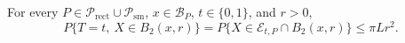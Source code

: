 For every \(P\in\mathcal P_{\mathrm{rect}}\cup\mathcal P_{\mathrm{sm}}\),
\(x\in\mathcal B_P\), \(t\in\{0,1\}\), and \(r>0\),
\[
 P\{T=t,\ X\in B_2(x,r)\}
 =P\{X\in\mathcal E_{t,P}\cap B_2(x,r)\}
 \leq\pi Lr^2.
\]